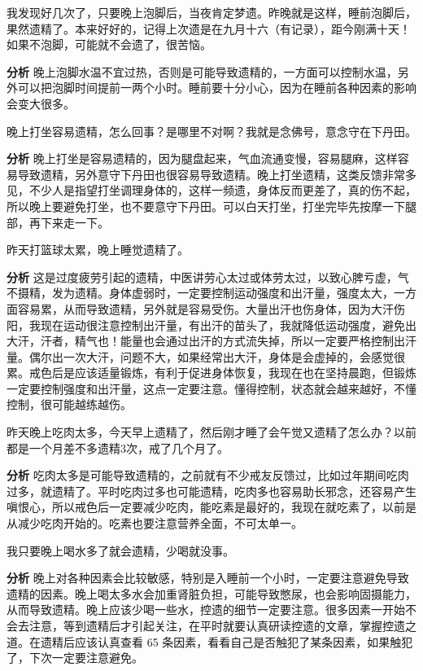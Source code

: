\begin{case}
    我发现好几次了，只要晚上泡脚后，当夜肯定梦遗。昨晚就是这样，睡前泡脚后，果然遗精了。本来好好的，记得上次遗是在九月十六（有记录），距今刚满十天！如果不泡脚，可能就不会遗了，很苦恼。

    \textbf{分析} 晚上泡脚水温不宜过热，否则是可能导致遗精的，一方面可以控制水温，另外可以把泡脚时间提前一两个小时。睡前要十分小心，因为在睡前各种因素的影响会变大很多。
\end{case}

\begin{case}
    晚上打坐容易遗精，怎么回事？是哪里不对啊？我就是念佛号，意念守在下丹田。

    \textbf{分析} 晚上打坐是容易遗精的，因为腿盘起来，气血流通变慢，容易腿麻，这样容易导致遗精，另外意守下丹田也很容易导致遗精。晚上打坐遗精，这类反馈非常多见，不少人是指望打坐调理身体的，这样一频遗，身体反而更差了，真的伤不起，所以晚上要避免打坐，也不要意守下丹田。可以白天打坐，打坐完毕先按摩一下腿部，再下来走一下。
\end{case}

\begin{case}
    昨天打篮球太累，晚上睡觉遗精了。

    \textbf{分析} 这是过度疲劳引起的遗精，中医讲劳心太过或体劳太过，以致心脾亏虚，气不摄精，发为遗精。身体虚弱时，一定要控制运动强度和出汗量，强度太大，一方面容易累，从而导致遗精，另外就是容易受伤。大量出汗也伤身体，因为大汗伤阳，我现在运动很注意控制出汗量，有出汗的苗头了，我就降低运动强度，避免出大汗，汗者，精气也！能量也会通过出汗的方式流失掉，所以一定要严格控制出汗量。偶尔出一次大汗，问题不大，如果经常出大汗，身体是会虚掉的，会感觉很累。戒色后是应该适量锻炼，有利于促进身体恢复，我现在也在坚持晨跑，但锻炼一定要控制强度和出汗量，这点一定要注意。懂得控制，状态就会越来越好，不懂控制，很可能越练越伤。
\end{case}

\begin{case}
    昨天晚上吃肉太多，今天早上遗精了，然后刚才睡了会午觉又遗精了怎么办？以前都是一个月差不多遗精3次，戒了几个月了。

    \textbf{分析} 吃肉太多是可能导致遗精的，之前就有不少戒友反馈过，比如过年期间吃肉过多，就遗精了。平时吃肉过多也可能遗精，吃肉多也容易助长邪念，还容易产生嗔恨心，所以戒色后一定要减少吃肉，能吃素是最好的，我现在就吃素了，以前是从减少吃肉开始的。吃素也要注意营养全面，不可太单一。
\end{case}

\begin{case}
    我只要晚上喝水多了就会遗精，少喝就没事。

    \textbf{分析} 晚上对各种因素会比较敏感，特别是入睡前一个小时，一定要注意避免导致遗精的因素。晚上喝太多水会加重肾脏负担，可能导致憋尿，也会影响固摄能力，从而导致遗精。晚上应该少喝一些水，控遗的细节一定要注意。很多因素一开始不会去注意，等到遗精后才引起关注，在平时就要认真研读控遗的文章，掌握控遗之道。在遗精后应该认真查看 65 条因素，看看自己是否触犯了某条因素，如果触犯了，下次一定要注意避免。
\end{case}

